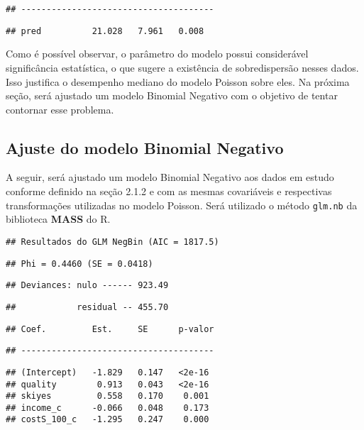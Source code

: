 \documentclass[
  twocolumn]{article}
\begin{document}
\begin{verbatim}
## --------------------------------------
\end{verbatim}

\begin{verbatim}
## pred          21.028   7.961   0.008
\end{verbatim}

Como é possível observar, o parâmetro do modelo possui considerável
significância estatística, o que sugere a existência de sobredispersão
nesses dados. Isso justifica o desempenho mediano do modelo Poisson
sobre eles. Na próxima seção, será ajustado um modelo Binomial Negativo
com o objetivo de tentar contornar esse problema.

\subsection{Ajuste do modelo Binomial
Negativo}\label{ajuste-do-modelo-binomial-negativo}

A seguir, será ajustado um modelo Binomial Negativo aos dados em estudo
conforme definido na seção 2.1.2 e com as mesmas covariáveis e
respectivas transformações utilizadas no modelo Poisson. Será utilizado
o método \texttt{glm.nb} da biblioteca \textbf{MASS} do R.

\begin{verbatim}
## Resultados do GLM NegBin (AIC = 1817.5)
\end{verbatim}

\begin{verbatim}
## Phi = 0.4460 (SE = 0.0418)
\end{verbatim}

\begin{verbatim}
## Deviances: nulo ------ 923.49
\end{verbatim}

\begin{verbatim}
##            residual -- 455.70
\end{verbatim}

\begin{verbatim}
## Coef.         Est.     SE      p-valor
\end{verbatim}

\begin{verbatim}
## --------------------------------------
\end{verbatim}

\begin{verbatim}
## (Intercept)   -1.829   0.147   <2e-16
## quality        0.913   0.043   <2e-16
## skiyes         0.558   0.170    0.001
## income_c      -0.066   0.048    0.173
## costS_100_c   -1.295   0.247    0.000
\end{verbatim}
\end{document}
